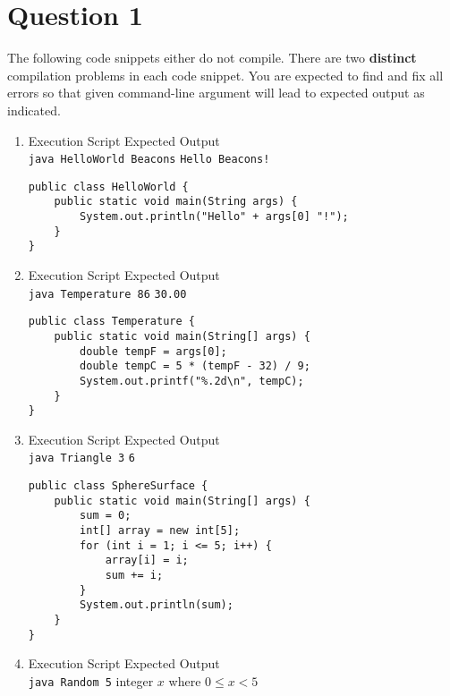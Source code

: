 \documentclass[12pt,letterpaper,twoside]{article}
\begin{document}


\section*{Question 1}

The following code snippets either do not compile.
There are two \textbf{distinct} compilation problems in each code snippet.
You are expected to find and fix all errors so that given command-line argument will lead to expected output as indicated.

\begin{enumerate}[label=\textbf{(\alph*)}]

\item Execution Script \hfill Expected Output\\
\texttt{java HelloWorld Beacons} \hfill \texttt{Hello Beacons!}
\begin{lstlisting}
public class HelloWorld {
	public static void main(String args) {
		System.out.println("Hello" + args[0] "!");
	}
}
\end{lstlisting}

\item Execution Script \hfill Expected Output\\
\texttt{java Temperature 86} \hfill \texttt{30.00}
\begin{lstlisting}
public class Temperature {
	public static void main(String[] args) {
		double tempF = args[0];
		double tempC = 5 * (tempF - 32) / 9;
		System.out.printf("%.2d\n", tempC);
	}
}
\end{lstlisting}

\newpage

\item Execution Script \hfill Expected Output\\
\texttt{java Triangle 3} \hfill \texttt{6}

\begin{lstlisting}
public class SphereSurface {
	public static void main(String[] args) {
		sum = 0;
		int[] array = new int[5];
		for (int i = 1; i <= 5; i++) {
			array[i] = i;
			sum += i;
		}
		System.out.println(sum);
	}
}
\end{lstlisting}

\item Execution Script \hfill Expected Output\\
\texttt{java Random 5} \hfill integer $x$ where $0 \leq x < 5$


\end{enumerate}
\end{document}
